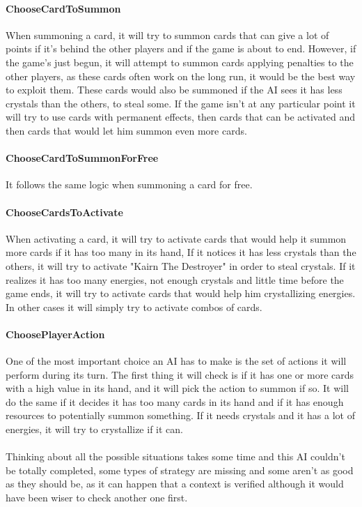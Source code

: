 \begin{appendices}
\paragraph{ChooseCardToSummon}
When summoning a card, it will try to summon cards that can give a lot of points if it's behind the other players and if the game is about to end. However, if the game's just begun, it will attempt to summon cards applying penalties to the other players, as these cards often work on the long run, it would be the best way to exploit them. These cards would also be summoned if the AI sees it has less crystals than the others, to steal some. If the game isn't at any particular point it will try to use cards with permanent effects, then cards that can be activated and then cards that would let him summon even more cards.

\paragraph{ChooseCardToSummonForFree}
It follows the same logic when summoning a card for free.

\paragraph{ChooseCardsToActivate}
When activating a card, it will try to activate cards that would help it summon more cards if it has too many in its hand, If it notices it has less crystals than the others, it will try to activate "Kairn The Destroyer" in order to steal crystals. If it realizes it has too many energies, not enough crystals and little time before the game ends, it will try to activate cards that would help him crystallizing energies. In other cases it will simply try to activate combos of cards.

\paragraph{ChoosePlayerAction}
One of the most important choice an AI has to make is the set of actions it will perform during its turn. The first thing it will check is if it has one or more cards with a high value in its hand, and it will pick the action to summon if so. It will do the same if it decides it has too many cards in its hand and if it has enough resources to potentially summon something. If it needs crystals and it has a lot of energies, it will try to crystallize if it can.
\\\\
Thinking about all the possible situations takes some time and this AI couldn't be totally completed, some types of strategy are missing and some aren't as good as they should be, as it can happen that a context is verified although it would have been wiser to check another one first.



\end{appendices}
